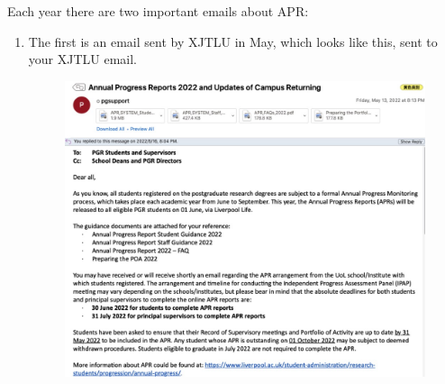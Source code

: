 Each year there are two important emails about APR:
\begin{enumerate}
    \item 
        \begin{minipage}{0.3\textwidth}
            The first is an email sent by XJTLU in May, which looks like this, sent to your XJTLU email.
        \end{minipage}
        \begin{minipage}{0.63\textwidth}
            \begin{figure}[H]
                \includegraphics[width=0.95\columnwidth, right]{author-folder/Kai.Wu/APR_email.jpg}
            \end{figure}
        \end{minipage}


\end{enumerate}
